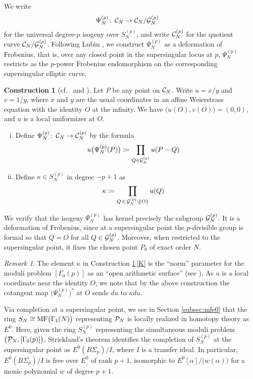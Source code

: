 \documentclass{gtpart}
\theoremstyle{definition}
\newtheorem{cstr}[thm]{Construction}
\theoremstyle{remark}
\newtheorem{rmk}[thm]{Remark}
\def\co{\colon\thinspace}
\newcommand{\CC}{{\cal C}}
\newcommand{\CG}{{\cal G}}
\newcommand{\CP}{{\cal P}}
\newcommand{\MF}{{\rm MF}}
\newcommand{\A}{\alpha}
\newcommand{\G}{\Gamma}
\newcommand{\K}{\kappa}
\newcommand{\ce}{\coloneqq}
\renewcommand{\=}{\approx}
\renewcommand{\-}{\sim}
\numberwithin{equation}{section}
\numberwithin{thm}{section}
\begin{document}
We write 
\[
 \Psi_N^{(p)} \co \CC_N \to \CC_N / \CG_N^{(p)} 
\]
for the universal degree-$p$ isogeny over $S_N^{(p)}$, and write $\CC_N^{(p)}$ 
for the quotient curve $\CC_N / \CG_N^{(p)}$.  Following Lubin 
\cite[proof of Theorem 1.4]{Lubin67}, we construct $\Psi_N^{(p)}$ as a 
deformation of Frobenius, that is, over any closed point in the supersingular 
locus at $p$, $\Psi_N^{(p)}$ restricts as the $p$-power Frobenius endomorphism 
on the corresponding supersingular elliptic curve.  

\begin{cstr}[{cf.~\cite[proof of Theorem 1.4]{Lubin67} and 
\cite[Section 7.7]{KM}}]
 \label{cstr}
 Let $P$ be any point on $\CC_N$.  Write $u = x / y$ and $v = 1 / y$, where $x$ 
 and $y$ are the usual coordinates in an affine Weierstrass equation with the 
 identity $O$ at the infinity.  We have $\big( u(O), v(O) \big) = (0,0)$, and 
 $u$ is a local uniformizer at $O$.  
 \begin{enumerate}[(i)]
  \item  Define $\Psi_N^{(p)} \co \CC_N \to \CC_N^{(p)}$ by the formula 
  \[
   u\big(\Psi_N^{(p)}(P)\big) \ce \prod_{Q \in \CG_N^{(p)}} u(P - Q) 
  \]

  \item \label{K}  Define $\K \in S_N^{(p)}$ in degree $-p + 1$ as 
  \[
   \K \ce \prod_{Q \, \in \, \CG_N^{(p)} \setminus \! \{O\}} u(Q) 
  \]
 \end{enumerate}
\end{cstr}
We verify that the isogeny $\Psi_N^{(p)}$ has kernel precisely the subgroup 
$\CG_N^{(p)}$.  It is a deformation of Frobenius, since at a supersingular point 
the $p$-divisible group is formal so that $Q = O$ for all $Q \in \CG_N^{(p)}$.  
Moreover, when restricted to the supersingular point, it fixes the chosen point 
$P_0$ of exact order $N$.  

\begin{rmk}
 \label{rmk:K}
 The element $\K$ in Construction \ref{cstr}\,\eqref{K} is the ``norm'' 
 parameter for the moduli problem $[\G_0(p)]$ as an ``open arithmetic surface'' 
 (see \cite[Section 7.7]{KM}).  As $u$ is a local coordinate near the identity 
 $O$, we note that by the above construction the cotangent map 
 $\big(\Psi_N^{(p)}\big)^*$ at $O$ sends $du$ to $\K du$.  
\end{rmk}

Via completion at a supersingular point, we see in Section \ref{subsec:mfe0} 
that the ring $S_N \cong \MF\big(\G_1(N)\big)$ representing $\CP_N$ is locally 
realized in homotopy theory as $E^0$.  Here, given the ring $S_N^{(p)}$ 
representing the simultaneous moduli problem $\big(\CP_N,[\G_0(p)]\big)$, 
Strickland's theorem \cite[Theorem 1.1]{Str98} identifies the completion of 
$S_N^{(p)}$ at the supersingular point as $E^0(B\Sigma_p) / I$, where $I$ is a 
transfer ideal.  In particular, $E^0(B\Sigma_p) / I$ is free over $E^0$ of rank 
$p + 1$, isomorphic to $E^0[\A] / \big( w(\A) \big)$ for a monic polynomial $w$ 
of degree $p + 1$.  
\end{document}
